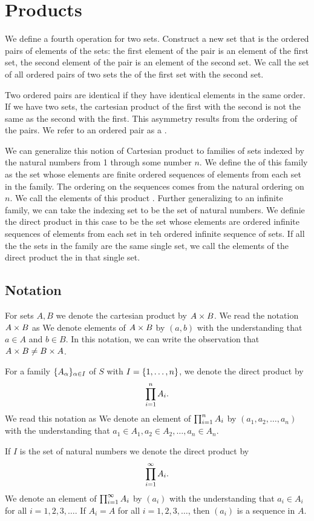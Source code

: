 \section{Products}

We define a fourth operation for two sets.
Construct a new set that is the ordered pairs of elements of the sets: the first element of the pair is an element of the first set, the second element of the pair is an element of the second set.
We call the set of all ordered pairs of two sets the  of the first set with the second set.

Two ordered pairs are identical if they have identical elements in the same order.
If we have two sets, the cartesian product of the first with the second is not the same as the second with the first.
This asymmetry results from the ordering of the pairs.
We refer to an ordered pair as a .

We can generalize this notion of Cartesian product to families of sets indexed by the natural numbers from 1 through some number $n$.
We define the  of this family as the set whose elements are finite ordered sequences of elements from each set in the family.
The ordering on the sequences comes from the natural ordering on $n$.
We call the elements of this product .
Further generalizing to an infinite family, we can take the indexing set to be the set of natural numbers.
We definie the direct product in this case to be the set whose elements are ordered infinite sequences of elements from each set in teh ordered infinite sequence of sets.
If all the the sets in the family are the same single set, we call the elements of the direct product the  in that single set.

\subsection{Notation}
For sets $A, B$ we denote the cartesian product by $A \times B$.
We read the notation $A \times B$ as 
We denote elements of $A \times B$ by $(a, b)$ with the understanding that $a \in A$ and $b \in B$.
In this notation, we can write the observation that $A \times B \neq B \times A$.

For a family $\{A_{\alpha}\}_{\alpha \in I}$ of $S$ with $I = \{1, \dots, n\}$, we denote the direct product by
\[
  \prod_{i = 1}^{n} A_{i}.
\]
We read this notation as 
We denote an element of $\prod_{i = 1}^{n} A_{i}$ by $(a_1, a_2, \dots, a_n)$ with the understanding that $a_1 \in A_1, a_2 \in A_2, \dots, a_n \in A_n$.

If $I$ is the set of natural numbers we denote the direct product by
\[
  \prod_{i = 1}^{\infty} A_{i}.
\]
We denote an element of $\prod_{i = 1}^{\infty} A_{i}$ by $(a_i)$ with the understanding that $a_i \in A_i$ for all $i = 1,2,3,\dots$.
If $A_i = A$ for all $i = 1, 2, 3,\dots$, then $(a_i)$ is a sequence in $A$.


